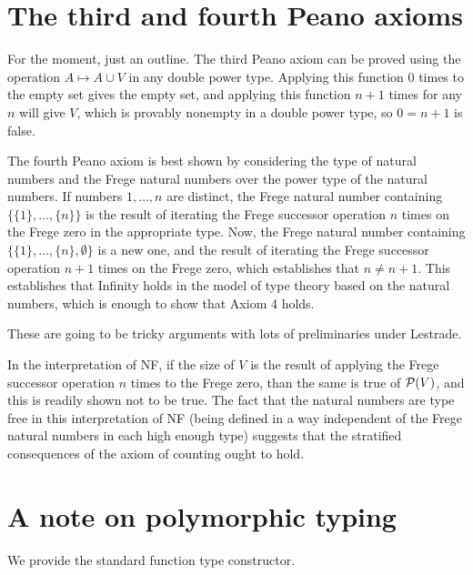 \documentclass[12pt]{article}
\begin{document}
\section{The third and fourth Peano axioms}

For the moment, just an outline.  The third Peano axiom can be proved using the operation $A \mapsto A \cup V$ in any double power type.  Applying this function 0 times to the empty set gives the empty set, and applying this function $n+1$ times for any $n$ will give $V$, which is provably nonempty in a double power type, so $0=n+1$ is false.

The fourth Peano axiom is best shown by considering the type of natural numbers and the Frege natural numbers over the power type of the natural numbers.  If numbers $1,\ldots,n$ are distinct, the Frege natural number containing $\{\{1\},\ldots,\{n\}\}$ is the result of iterating the Frege successor operation $n$ times on the Frege zero in the appropriate type.  Now, the Frege natural number containing $\{\{1\},\ldots,\{n\},\emptyset\}$ is a new one, and the result of iterating the Frege successor operation $n+1$ times on the Frege zero, which establishes that $n \neq n+1$.   This establishes that Infinity holds in the model of type theory based on the natural numbers, which is enough to show that Axiom 4 holds.

These are going to be tricky arguments with lots of preliminaries under Lestrade.

In the interpretation of NF, if the size of $V$ is the result of applying the Frege successor operation $n$ times to the Frege zero, than the same is true of ${\cal  P}(V)$, and this is readily shown not to be true.  The fact that the natural numbers are type free in this interpretation of NF (being defined in a way independent of the Frege natural numbers in each high enough type) suggests that the stratified consequences of the axiom of counting ought to hold.

\section{A note on polymorphic typing}

We provide the standard function type constructor.
\end{document}
